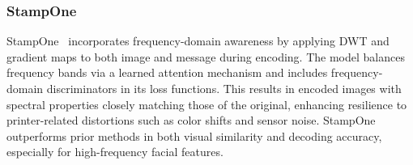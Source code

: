 \subsubsection{StampOne}
StampOne~\cite{stampone2024} incorporates frequency-domain awareness by applying DWT and gradient maps to both image and message during encoding. The model balances frequency bands via a learned attention mechanism and includes frequency-domain discriminators in its loss functions. This results in encoded images with spectral properties closely matching those of the original, enhancing resilience to printer-related distortions such as color shifts and sensor noise. StampOne outperforms prior methods in both visual similarity and decoding accuracy, especially for high-frequency facial features.
